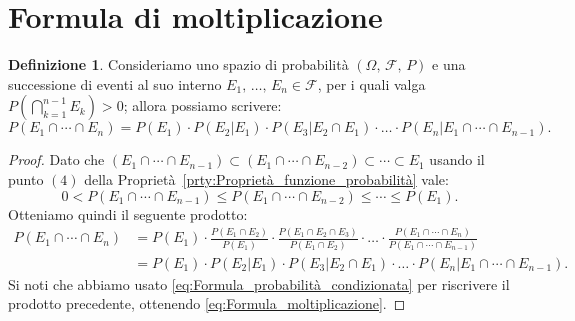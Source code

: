 \documentclass[12pt,openany]{amsbook}
\theoremstyle{plain}
\numberwithin{equation}{section} %
\theoremstyle{definition}
\newtheorem{defn}[thm]{Definizione}
\begin{document}
        \section{Formula di moltiplicazione}
            \begin{defn}\label{defn:Formula_moltiplicazione}
                Consideriamo uno spazio di probabilità $(\Omega,\,\mathscr{F},\,P)$ e una successione di eventi al suo interno $E_1,\,\ldots,\,E_n \in \mathscr{F}$, per i quali valga $P(\bigcap_{k=1}^{n-1} E_k) > 0$; allora possiamo scrivere:
                \begin{equation}\label{eq:Formula_moltiplicazione}
                    P(E_1 \cap \dotsm \cap E_n) = P(E_1) \cdot P(E_2|E_1) \cdot P(E_3|E_2 \cap E_1) \cdot \ldots \cdot P(E_n|E_1 \cap \dotsm \cap E_{n-1})
                .
                \end{equation}
            \end{defn}
            \begin{proof}
                Dato che $(E_1 \cap \dotsm \cap E_{n-1}) \subset (E_1 \cap \dotsm \cap E_{n-2}) \subset \dotsm \subset E_1$ usando il punto $(4)$ della Proprietà~\ref{prty:Proprietà_funzione_probabilità} vale: \[
                    0 < P(E_1 \cap \dotsm \cap E_{n-1}) \leq P(E_1 \cap \dotsm \cap E_{n-2}) \leq \dotsm \leq P(E_1)
                .\]
                Otteniamo quindi il seguente prodotto:
                \begin{align*}
                    P(E_1 \cap \dotsm \cap E_n) &= P(E_1) \cdot \frac{P(E_1 \cap E_2)}{P(E_1)} \cdot \frac{P(E_1 \cap E_2 \cap E_3)}{P(E_1 \cap E_2)} \cdot \ldots \cdot \frac{P(E_1 \cap \dotsm \cap E_n)}{P(E_1 \cap \dotsm \cap E_{n-1})} \\ &= P(E_1) \cdot P(E_2|E_1) \cdot P(E_3|E_2 \cap E_1) \cdot \ldots \cdot P(E_n|E_1 \cap \dotsm \cap E_{n-1})
                .
                \end{align*}
                Si noti che abbiamo usato \eqref{eq:Formula_probabilità_condizionata} per riscrivere il prodotto precedente, ottenendo \eqref{eq:Formula_moltiplicazione}.
            \end{proof}
\end{document}
